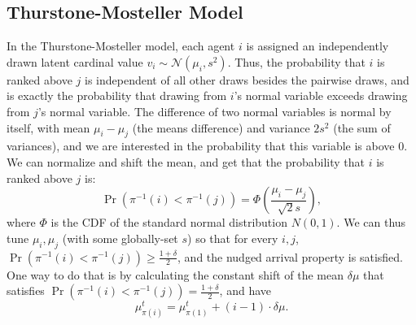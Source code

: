 





\subsection*{Thurstone-Mosteller Model \cite{ThurstoneModel}}

In the Thurstone-Mosteller model, each agent \( i \) is assigned an independently drawn latent cardinal value \( v_i \sim \mathcal{N}(\mu_i, s^2) \). Thus, the probability that \( i \) is ranked above \( j \) is independent of all other draws besides the pairwise draws, and is exactly the probability that drawing from $i$'s normal variable exceeds drawing from $j$'s normal variable. The difference of two normal variables is normal by itself, with mean $\mu_i - \mu_j$ (the means difference) and variance $2s^2$ (the sum of variances), and we are interested in the probability that this variable is above $0$. We can normalize and shift the mean, and get that the probability that \( i \) is ranked above \( j \) is:
\[
\Pr(\pi^{-1}(i) < \pi^{-1}(j)) = \Phi\left(\frac{\mu_i - \mu_j}{\sqrt{2}s}\right),
\]
where \( \Phi \) is the CDF of the standard normal distribution $N(0,1)$. We can thus tune $\mu_i, \mu_j$ (with some globally-set $s$) so that for every $i,j$,  \( \Pr(\pi^{-1}(i) < \pi^{-1}(j)) \geq \frac{1+\delta}{2} \), and the nudged arrival property is satisfied. One way to do that is by calculating the constant shift of the mean $\delta\mu$ that satisfies \( \Pr(\pi^{-1}(i) < \pi^{-1}(j)) = \frac{1+\delta}{2}\), and have
\[
\mu_{\pi(i)}^{t} = \mu_{\pi(1)}^{t} + (i-1)\cdot \delta\mu. 
\]


